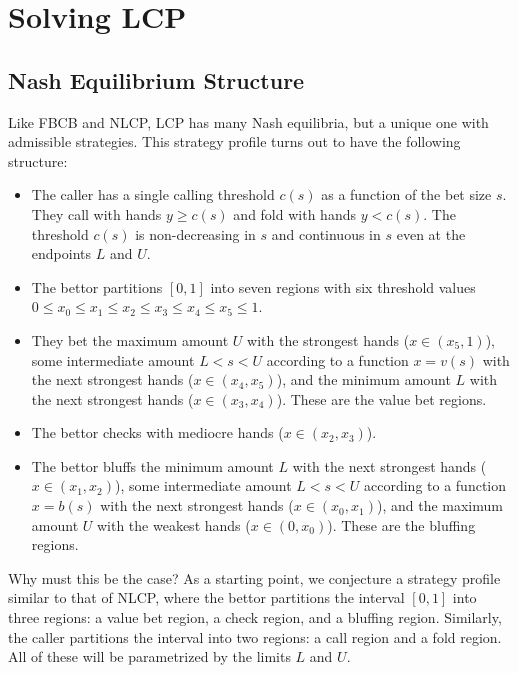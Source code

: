 \documentclass[a4paper,12pt]{article}
\theoremstyle{plain}
\theoremstyle{definition}
\begin{document}
\section{Solving LCP}



\subsection{Nash Equilibrium Structure}


\label{subsec:nash_equilibrium_structure}
Like FBCB and NLCP, LCP has many Nash equilibria, but a unique one with admissible strategies. This strategy profile turns out to have the following structure:

\begin{itemize}
    \item The caller has a single calling threshold $c(s)$ as a function of the bet size $s$. They call with hands $y \geq c(s)$ and fold with hands $y < c(s)$. The threshold $c(s)$ is non-decreasing in $s$ and continuous in $s$ even at the endpoints $L$ and $U$.
    \item The bettor partitions $[0, 1]$ into seven regions with six threshold values $0 \leq x_0\leq x_1\leq x_2\leq x_3 \leq x_4 \leq x_5 \leq 1$. 
    \item They bet the maximum amount $U$ with the strongest hands ($x \in (x_5, 1)$), some intermediate amount $L < s < U$ according to a function $x = v(s)$ with the next strongest hands ($x \in (x_4, x_5)$), and the minimum amount $L$ with the next strongest hands ($x \in (x_3, x_4)$). These are the value bet regions.
    \item The bettor checks with mediocre hands ($x \in (x_2, x_3)$).
    \item The bettor bluffs the minimum amount $L$ with the next strongest hands ($x \in (x_1, x_2)$), some intermediate amount $L < s < U$ according to a function $x = b(s)$ with the next strongest hands ($x \in (x_0, x_1)$), and the maximum amount $U$ with the weakest hands ($x \in (0, x_0)$). These are the bluffing regions.
\end{itemize}

Why must this be the case? As a starting point, we conjecture a strategy profile similar to that of NLCP, where the bettor partitions the interval $[0, 1]$ into three regions: a value bet region, a check region, and a bluffing region. Similarly, the caller partitions the interval into two regions: a call region and a fold region. All of these will be parametrized by the limits $L$ and $U$. 
\end{document}
